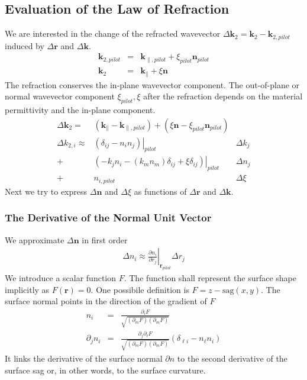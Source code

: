 \documentclass[12pt,a4paper,twoside,openright,BCOR10mm,headsepline,titlepage,abstracton,chapterprefix,final]{scrreprt}
\newcommand\Vector[1]{{\mathbf{#1}}}
\newcommand\wavenumber{k}
\newcommand\Wavevector{\Vector{\wavenumber}}
\begin{document}
\subsection{Evaluation of the Law of Refraction}



We are interested in the change of the refracted wavevector $\Delta\Wavevector_2 = {\Wavevector}_2 - \Wavevector_{2, pilot}$ induced by $\Delta\Vector{r}$ and $\Delta\Wavevector$.
\begin{eqnarray}
 \Wavevector_{2, pilot} &=& \Wavevector_{\parallel, pilot} + \xi_{pilot} \Vector{n}_{pilot} 
 \\
 {\Wavevector}_2 &=& {\Wavevector}_{\parallel} + {\xi} {\Vector{n}} 
\end{eqnarray}
The refraction conserves the in-plane wavevector component. 
The out-of-plane or normal wavevector component $\xi_{pilot}, {\xi}$ after the refraction depends on the material permittivity and the in-plane component.
\begin{eqnarray}
 \Delta\Wavevector_2 =& ( {\Wavevector}_{\parallel} - \Wavevector_{\parallel, pilot} ) + ( {\xi} {\Vector{n}} - \xi_{pilot} \Vector{n}_{pilot} )&
\\[2ex]
 \Delta \wavenumber_{2,i} \approx&
   \left.
     \left( \delta_{ij}  - n_{i} n_{j} \right)
   \right|_{pilot}
   &\Delta\wavenumber_j
   \nonumber\\
   +&
   \left.
   \left(
     - \wavenumber_{j}  n_{i} 
     - (\wavenumber_{m} n_{m}) \delta_{ij}  
     + \xi \delta_{ij}
   \right) 
   \right|_{pilot}
   &\Delta n_{j}
   \nonumber \\
   +& n_{i, pilot} &\Delta\xi 
\end{eqnarray}
Next we try to express $\Delta\Vector{n}$ and $\Delta\xi$ as functions of $\Delta\Vector{r}$ and $\Delta\Wavevector$.


\subsubsection{The Derivative of the Normal Unit Vector}
We approximate $\Delta\Vector{n}$ in first order
\begin{eqnarray}
 \Delta n_i \approx \left. \frac{\partial n_i}{\partial r_j} \right|_{\Vector{r}_{pilot}} \Delta r_j
\end{eqnarray}
We introduce a scalar function $F$. The function shall represent the surface shape implicitly as $F(\Vector{r}) = 0$. 
One possibile definition is $F = z - \textrm{sag}(x,y)$. The surface normal points in the direction of the gradient of $F$
\begin{eqnarray}
 n_i &=& \frac{\partial_i F}{\sqrt{(\partial_m F)(\partial_m F)}}
 \\
 \partial_j n_i &=& \frac{\partial_j \partial_\ell F}{\sqrt{(\partial_m F)(\partial_m F)}} \left(\delta_{\ell i} - n_\ell n_i\right)
 \label{eq:nderivative}
\end{eqnarray}
It links the derivative of the surface normal $\partial n$ to the second derivative of the surface sag 
or, in other words, to the surface curvature.
\end{document}
